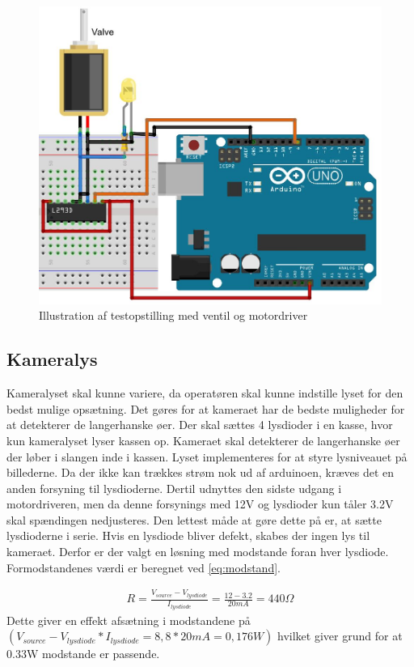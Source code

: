 \begin{figure}[H]
	\centering
	\includegraphics[width=1\textwidth]{billeder/Hardware/diagrammer/Ventilbreadboard.JPG}
	\caption{Illustration af testopstilling med ventil og motordriver}
	\label{fig:ventilbreadboard}
\end{figure} 
 
\newpage
 \subsection{Kameralys}
 \label{subsec:kameralys}
 Kameralyset skal kunne variere, da operatøren skal kunne indstille lyset for den bedst mulige opsætning. Det gøres for at kameraet har de bedste muligheder for at detekterer de langerhanske øer. Der skal sættes 4 lysdioder i en kasse, hvor kun kameralyset lyser kassen op. Kameraet skal detekterer de langerhanske øer der løber i slangen inde i kassen. Lyset implementeres for at styre lysniveauet på billederne. Da der ikke kan trækkes strøm nok ud af arduinoen, kræves det en anden forsyning til lysdioderne. Dertil udnyttes den sidste udgang i motordriveren, men da denne forsynings med 12V og lysdioder kun tåler 3.2V skal spændingen nedjusteres. Den lettest måde at gøre dette på er, at sætte lysdioderne i serie. Hvis en lysdiode bliver defekt, skabes der ingen lys til kameraet. Derfor er der valgt en løsning med modstande foran hver lysdiode. Formodstandenes værdi er beregnet ved \ref{eq:modstand}. 

\begin{align}
R=\frac{V_{source}-V_{lysdiode}}{I_{lysdiode}}=\frac{12-3.2}{20mA}=440\Omega
\label{eq:modstand}
\end{align} 
Dette giver en effekt afsætning i modstandene på $(V_{source}-V_{lysdiode}*I_{lysdiode}=8,8*20mA=0,176W)$ hvilket giver grund for at 0.33W modstande er passende.

